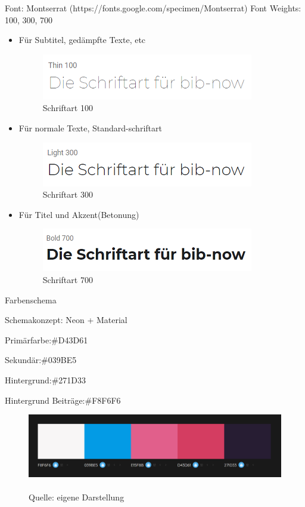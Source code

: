\documentclass[12pt,titlepage]{article}
\begin{document}
Font: Montserrat (https://fonts.google.com/specimen/Montserrat)
Font Weights: 100, 300, 700
\vspace{2cm}
\begin{itemize}
\item
	Für Subtitel, gedämpfte Texte, etc

\begin{figure}[hbt!]
\includegraphics{images/Schriftart_100.png}
\caption{Schriftart 100}
\end{figure}
\item
	Für normale Texte, Standard-schriftart

\begin{figure}[hbt!]
\includegraphics{images/Schriftart_300.png}
\caption{Schriftart 300}
\end{figure}
\item
	Für Titel und Akzent(Betonung)

\begin{figure}[hbt!]
\includegraphics{images/Schriftart_700.png}
\caption{Schriftart 700}
\end{figure}
\end{itemize}


Farbenschema

Schemakonzept: Neon + Material

Primärfarbe:\#D43D61

Sekundär:\#039BE5

Hintergrund:\#271D33

Hintergrund Beiträge:\#F8F6F6

\begin{figure}[hbt!]
\centering
\includegraphics[width=400pt]{images/Schema_1.png}
\caption[Farbenschema]{\\Quelle: eigene Darstellung}
\end{figure}
\end{document}
